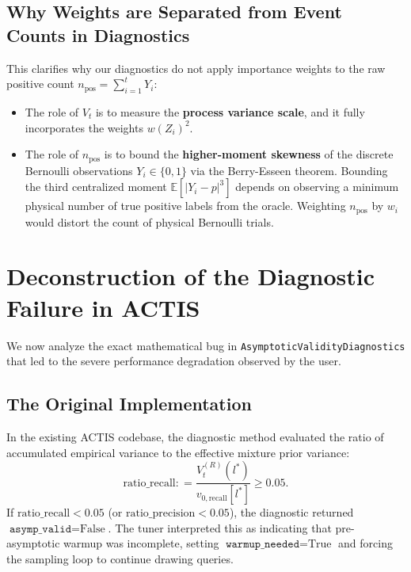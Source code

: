 \documentclass[11pt,a4paper]{article}
\newcommand{\coloneqq}{\mathrel{\mathop:}=}
\begin{document}
\subsection{Why Weights are Separated from Event Counts in Diagnostics}
This clarifies why our diagnostics do not apply importance weights to the raw positive count $n_{\text{pos}} = \sum_{i=1}^t Y_i$:
\begin{itemize}[leftmargin=*]
    \item The role of $V_t$ is to measure the \textbf{process variance scale}, and it fully incorporates the weights $w(Z_i)^2$.
    \item The role of $n_{\text{pos}}$ is to bound the \textbf{higher-moment skewness} of the discrete Bernoulli observations $Y_i \in \{0, 1\}$ via the Berry-Esseen theorem. Bounding the third centralized moment $\mathbb{E}[|Y_i - p|^3]$ depends on observing a minimum physical number of true positive labels from the oracle. Weighting $n_{\text{pos}}$ by $w_i$ would distort the count of physical Bernoulli trials.
\end{itemize}

\newpage
\section{Deconstruction of the Diagnostic Failure in ACTIS}

We now analyze the exact mathematical bug in \texttt{AsymptoticValidityDiagnostics} that led to the severe performance degradation observed by the user.

\subsection{The Original Implementation}
In the existing ACTIS codebase, the diagnostic method evaluated the ratio of accumulated empirical variance to the effective mixture prior variance:
\begin{equation}\label{eq:orig_ratio}
\text{ratio\_recall} \coloneqq \frac{V_t^{(R)}(l^*)}{v_{0, \text{recall}}[l^*]} \ge 0.05.
\end{equation}
If $\text{ratio\_recall} < 0.05$ (or $\text{ratio\_precision} < 0.05$), the diagnostic returned $\texttt{asymp\_valid} = \text{False}$. The tuner interpreted this as indicating that pre-asymptotic warmup was incomplete, setting $\texttt{warmup\_needed} = \text{True}$ and forcing the sampling loop to continue drawing queries.
\end{document}

